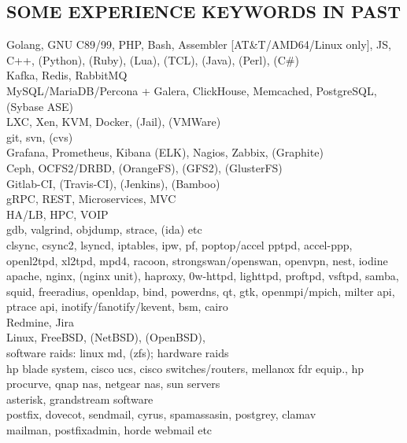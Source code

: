 \begin{resume}
\section{SOME EXPERIENCE KEYWORDS IN PAST}
\vspace{0.1in} 
    Golang, GNU C89/99, PHP, Bash, Assembler [AT\&T/AMD64/Linux only], JS, C++, (Python), (Ruby), (Lua), (TCL), (Java), (Perl), (C\#)\\
    Kafka, Redis, RabbitMQ\\
    MySQL/MariaDB/Percona + Galera, ClickHouse, Memcached, PostgreSQL, (Sybase ASE)\\
    LXC, Xen, KVM, Docker, (Jail), (VMWare)\\
    git, svn, (cvs)\\
    Grafana, Prometheus, Kibana (ELK), Nagios, Zabbix, (Graphite)\\
    Ceph, OCFS2/DRBD, (OrangeFS), (GFS2), (GlusterFS)\\
    Gitlab-CI, (Travis-CI), (Jenkins), (Bamboo)\\
    gRPC, REST, Microservices, MVC\\
    HA/LB, HPC, VOIP\\
    gdb, valgrind, objdump, strace, (ida) etc\\
    clsync, csync2, lsyncd, iptables, ipw, pf, poptop/accel pptpd, accel-ppp, openl2tpd, xl2tpd, mpd4, racoon, strongswan/openswan, openvpn, nest, iodine apache, nginx, (nginx unit), haproxy, 0w-httpd, lighttpd, proftpd, vsftpd, samba, squid, freeradius, openldap, bind, powerdns, qt, gtk, openmpi/mpich, milter api, ptrace api, inotify/fanotify/kevent, bsm, cairo\\
    Redmine, Jira\\
    Linux, FreeBSD, (NetBSD), (OpenBSD),\\
    software raids: linux md, (zfs); hardware raids\\
    hp blade system, cisco ucs, cisco switches/routers, mellanox fdr equip., hp procurve, qnap nas, netgear nas, sun servers\\
    asterisk, grandstream software\\
    postfix, dovecot, sendmail, cyrus, spamassasin, postgrey, clamav\\
    mailman, postfixadmin, horde webmail etc\\

\end{resume}
